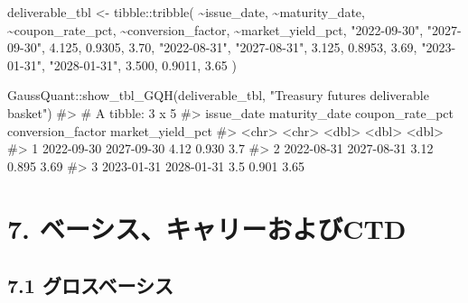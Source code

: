 \documentclass[
  letterpaper,
  DIV=11,
  numbers=noendperiod]{scrreprt}
\newenvironment{Shaded}{\begin{snugshade}}{\end{snugshade}}
\newcommand{\CommentTok}[1]{\textcolor[rgb]{0.37,0.37,0.37}{#1}}
\newcommand{\FloatTok}[1]{\textcolor[rgb]{0.68,0.00,0.00}{#1}}
\newcommand{\FunctionTok}[1]{\textcolor[rgb]{0.28,0.35,0.67}{#1}}
\newcommand{\NormalTok}[1]{\textcolor[rgb]{0.00,0.23,0.31}{#1}}
\newcommand{\OtherTok}[1]{\textcolor[rgb]{0.00,0.23,0.31}{#1}}
\newcommand{\SpecialCharTok}[1]{\textcolor[rgb]{0.37,0.37,0.37}{#1}}
\newcommand{\StringTok}[1]{\textcolor[rgb]{0.13,0.47,0.30}{#1}}
\begin{document}
\begin{Shaded}
\begin{Highlighting}[]
\NormalTok{deliverable\_tbl }\OtherTok{\textless{}{-}}\NormalTok{ tibble}\SpecialCharTok{::}\FunctionTok{tribble}\NormalTok{(}
  \SpecialCharTok{\textasciitilde{}}\NormalTok{issue\_date, }\SpecialCharTok{\textasciitilde{}}\NormalTok{maturity\_date, }\SpecialCharTok{\textasciitilde{}}\NormalTok{coupon\_rate\_pct, }\SpecialCharTok{\textasciitilde{}}\NormalTok{conversion\_factor, }\SpecialCharTok{\textasciitilde{}}\NormalTok{market\_yield\_pct,}
  \StringTok{"2022{-}09{-}30"}\NormalTok{, }\StringTok{"2027{-}09{-}30"}\NormalTok{, }\FloatTok{4.125}\NormalTok{, }\FloatTok{0.9305}\NormalTok{, }\FloatTok{3.70}\NormalTok{,}
  \StringTok{"2022{-}08{-}31"}\NormalTok{, }\StringTok{"2027{-}08{-}31"}\NormalTok{, }\FloatTok{3.125}\NormalTok{, }\FloatTok{0.8953}\NormalTok{, }\FloatTok{3.69}\NormalTok{,}
  \StringTok{"2023{-}01{-}31"}\NormalTok{, }\StringTok{"2028{-}01{-}31"}\NormalTok{, }\FloatTok{3.500}\NormalTok{, }\FloatTok{0.9011}\NormalTok{, }\FloatTok{3.65}
\NormalTok{)}

\NormalTok{GaussQuant}\SpecialCharTok{::}\FunctionTok{show\_tbl\_GQH}\NormalTok{(deliverable\_tbl, }\StringTok{"Treasury futures deliverable basket"}\NormalTok{)}
\CommentTok{\#\textgreater{} \# A tibble: 3 x 5}
\CommentTok{\#\textgreater{}   issue\_date maturity\_date coupon\_rate\_pct conversion\_factor market\_yield\_pct}
\CommentTok{\#\textgreater{}   \textless{}chr\textgreater{}      \textless{}chr\textgreater{}                   \textless{}dbl\textgreater{}             \textless{}dbl\textgreater{}            \textless{}dbl\textgreater{}}
\CommentTok{\#\textgreater{} 1 2022{-}09{-}30 2027{-}09{-}30               4.12             0.930             3.7 }
\CommentTok{\#\textgreater{} 2 2022{-}08{-}31 2027{-}08{-}31               3.12             0.895             3.69}
\CommentTok{\#\textgreater{} 3 2023{-}01{-}31 2028{-}01{-}31               3.5              0.901             3.65}
\end{Highlighting}
\end{Shaded}

\section{7.
ベーシス、キャリーおよびCTD}\label{ux30d9ux30fcux30b7ux30b9ux30adux30e3ux30eaux30fcux304aux3088ux3073ctd}

\subsection{7.1
グロスベーシス}\label{ux30b0ux30edux30b9ux30d9ux30fcux30b7ux30b9}
\end{document}
